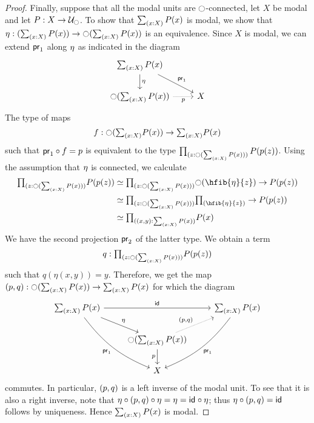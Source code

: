 \begin{proof}
Finally, suppose that all the modal units are ${\ocircle}$-connected, let $X$ be modal and let $P:X\to\mathcal{U}_{\ocircle}$.
To show that $\sm{x:X}P(x)$ is modal, we show that
$\modalunit:(\sm{x:X}P(x))\to\modal(\sm{x:X}P(x))$ is an equivalence.
Since $X$ is modal, we can extend $\mathsf{pr}_{1}$ along ${\eta_{}}$ as indicated
in the diagram
\begin{equation*}
\begin{tikzcd}
\sm{x:X}P(x) \arrow[d,"\modalunit"] \arrow[dr,"\proj 1"] \\
\modal(\sm{x:X}P(x)) \arrow[r,densely dotted,swap,"p"] & X
\end{tikzcd}
\end{equation*}
The type of maps
\begin{equation*}
f:\modal(\sm{x:X}P(x))\to \sm{x:X}P(x)
\end{equation*}
such that $\mathsf{pr}_{1}\circ f=p$ is equivalent to the type $\prd{z:\modal(\sm{x:X}P(x))}P(p(z))$.
Using the assumption that ${\eta_{}}$ is connected, we calculate
\begin{align*}
\prd{z:\modal(\sm{x:X}P(x))}P(p(z))
& \eqvsym \prd{z:\modal(\sm{x:X}P(x))} \modal(\hfib{\modalunit}{z})\to P(p(z)) \\
& \eqvsym \prd{z:\modal(\sm{x:X}P(x))} \hfib{\modalunit}{z}\to P(p(z)) \\
& \eqvsym \prd{\pairr{x,y}:\sm{x:X}P(x)} P(x)
\end{align*}
We have the second projection $\mathsf{pr}_{2}$ of the latter type. We obtain a term
\begin{equation*}
q : \prd{z:\modal(\sm{x:X}P(x))}P(p(z))
\end{equation*}
such that $q(\eta(x,y))=y$. Therefore, we get the map $\pairr{p,q}:\modal(\sm{x:X}P(x))\to \sm{x:X}P(x)$ for which the diagram
\begin{equation*}
\begin{tikzcd}
\sm{x:X}P(x) \arrow[dr,"\modalunit"] \arrow[ddr,bend right=15,swap,"\proj 1"] \arrow[rr,"\idfunc"] & & \sm{x:X}P(x) \arrow[ddl,bend left=15,"\proj 1"] \\
& \modal(\sm{x:X}P(x)) \arrow[d,swap,"p"] \arrow[ur,densely dotted,"\pairr{p,q}"] \\
& X
\end{tikzcd}
\end{equation*}
commutes. In particular, ${\mathopen{}(p,q)\mathclose{}}$ is a left inverse of the modal unit.
To see that it is also a right inverse, note that ${\eta_{}}\circ{\mathopen{}(p,q)\mathclose{}}\circ{\eta_{}}={\eta_{}}=\mathsf{id}_{}\circ{\eta_{}}$; thus ${\eta_{}}\circ{\mathopen{}(p,q)\mathclose{}}=\mathsf{id}_{}$ follows by uniqueness.
Hence $\sm{x:X}P(x)$ is modal.
\end{proof}

